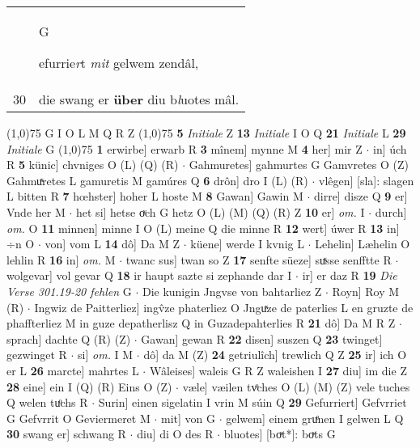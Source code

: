 \documentclass[8pt,a4paper,notitlepage]{article}
\begin{document}
\begin{table}[ht]
\begin{minipage}[t]{0.5\linewidth}
\begin{tabular}{rl}
 & \begin{large}G\end{large}efurrie\textit{r}t \textit{mit} gelwem zendâl,\\ 
30 & die swang er \textbf{über} diu b\textit{l}uotes mâl.\\ 
\end{tabular}
\scriptsize
\line(1,0){75} \newline
G I O L M Q R Z \newline
\line(1,0){75} \newline
\textbf{5} \textit{Initiale} Z  \textbf{13} \textit{Initiale} I O Q  \textbf{21} \textit{Initiale} L  \textbf{29} \textit{Initiale} G  \newline
\line(1,0){75} \newline
\textbf{1} erwirbe] erwarb R \textbf{3} mînem] mynne M \textbf{4} her] mir Z  $\cdot$ in] úch R \textbf{5} künic] chvniges O (L) (Q) (R)  $\cdot$ Gahmuretes] gahmurtes G Gamvretes O (Z) Gahmuͯretes L gamuretis M gamúres Q \textbf{6} drôn] dro I (L) (R)  $\cdot$ vlêgen] [sla]: slagen L bitten R \textbf{7} hœhster] hoher L hoste M \textbf{8} Gawan] Gawin M  $\cdot$ dirre] disze Q \textbf{9} er] Vnde her M  $\cdot$ het si] hetse oͮch G hetz O (L) (M) (Q) (R) Z \textbf{10} er] \textit{om.} I  $\cdot$ durch] \textit{om.} O \textbf{11} minnen] minne I O (L) meine Q die minne R \textbf{12} wert] úwer R \textbf{13} in] ÷n O  $\cdot$ von] vom L \textbf{14} dô] Da M Z  $\cdot$ küene] werde I kvnig L  $\cdot$ Lehelin] Læhelin O lehlin R \textbf{16} in] \textit{om.} M  $\cdot$ twanc sus] twan so Z \textbf{17} senfte süeze] suͯsse senfftte R  $\cdot$ wolgevar] vol gevar Q \textbf{18} ir haupt sazte si zephande dar I  $\cdot$ ir] er daz R \textbf{19} \textit{Die Verse 301.19-20 fehlen} G   $\cdot$ Die kunigin Jngvse von bahtarliez Z  $\cdot$ Royn] Roy M (R)  $\cdot$ Ingwiz de Paitterliez] ingv̂ze phaterliez O Jnguͯze de paterlies L en gruzte de phaffterliez M in guze depatherlisz Q in Guzadepahterlies R \textbf{21} dô] Da M R Z  $\cdot$ sprach] dachte Q (R) (Z)  $\cdot$ Gawan] gewan R \textbf{22} disen] suszen Q \textbf{23} twinget] gezwinget R  $\cdot$ si] \textit{om.} I M  $\cdot$ dô] da M (Z) \textbf{24} getriulîch] trewlich Q Z \textbf{25} ir] ich O er L \textbf{26} marcte] mahrtes L  $\cdot$ Wâleises] waleis G R Z waleishen I \textbf{27} diu] im die Z \textbf{28} eine] ein I (Q) (R) Eins O (Z)  $\cdot$ væle] væilen tvͦches O (L) (M) (Z) vele tuches Q welen tuͦchs R  $\cdot$ Surin] einen sigelatin I vrin M súin Q \textbf{29} Gefurriert] Gefvrriet G Gefvrrit O Geviermeret M  $\cdot$ mit] von G  $\cdot$ gelwem] einem gruͤnen I gelwen L Q \textbf{30} swang er] schwang R  $\cdot$ diu] di O des R  $\cdot$ bluotes] [boͮt*]: boͮts G \newline

\end{minipage}
\end{table}
\end{document}
